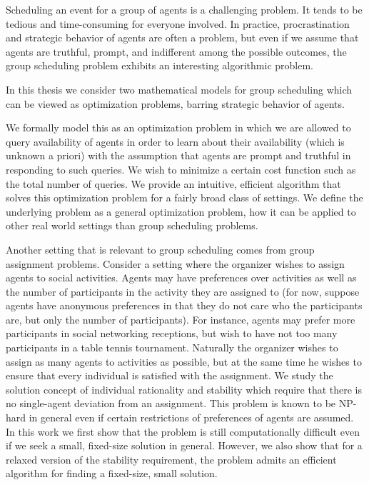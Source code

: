 Scheduling an event for a group of agents is a challenging problem. 
It tends to be tedious and time-consuming for everyone involved. In practice, procrastination and strategic behavior of agents are often a problem, but even if we assume that agents are truthful, prompt, and indifferent among the possible outcomes, the group scheduling problem exhibits an interesting algorithmic problem. 

In this thesis we consider two mathematical models for group scheduling which can be viewed as optimization problems, barring strategic behavior of agents. 



We formally model this as an optimization problem in which we are allowed to query availability of agents in order to learn about their availability (which is unknown a priori) with the assumption that agents are prompt and truthful in responding to such queries. We wish to minimize a certain cost function such as the total number of queries. We provide an intuitive, efficient algorithm that solves this optimization problem for a fairly broad class of settings. We define the underlying problem as a general optimization problem, how it can be applied to other real world settings than group scheduling problems.

Another setting that is relevant to group scheduling comes from group assignment problems. Consider a setting where the organizer wishes to assign agents to social activities. Agents may have preferences over activities as well as the number of participants in the activity they are assigned to (for now, suppose agents have anonymous preferences in that they do not care who the participants are, but only the number of participants). For instance, agents may prefer more participants in social networking receptions, but wish to have not too many participants in a table tennis tournament. Naturally the organizer wishes to assign as many agents to activities as possible, but at the same time he wishes to ensure that every individual is satisfied with the assignment. We study the solution concept of individual rationality and stability which require that there is no single-agent deviation from an assignment. This problem is known to be NP-hard in general even if certain restrictions of preferences of agents are assumed. In this work we first show that the problem is still computationally difficult even if we seek a small, fixed-size solution in general. However, we also show that for a relaxed version of the stability requirement, the problem admits an efficient algorithm for finding a fixed-size, small solution. 

